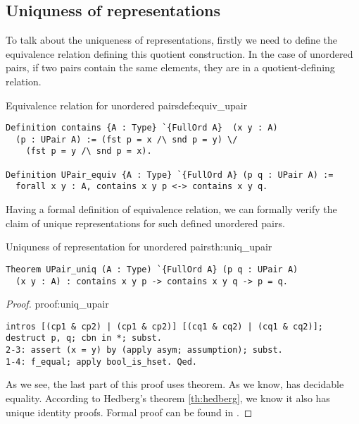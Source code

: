 \subsection{Uniquness of representations}
To talk about the uniqueness of representations, firstly we need to define the equivalence relation defining this quotient construction. In the case of unordered pairs, if two pairs contain the same elements, they are in a quotient-defining relation.
\begin{defi}{Equivalence relation for unordered pairs}{def:equiv_upair}
\begin{verbatim}
Definition contains {A : Type} `{FullOrd A}  (x y : A)
  (p : UPair A) := (fst p = x /\ snd p = y) \/ 
    (fst p = y /\ snd p = x).

Definition UPair_equiv {A : Type} `{FullOrd A} (p q : UPair A) :=
  forall x y : A, contains x y p <-> contains x y q. 
\end{verbatim}
\end{defi}
Having a formal definition of equivalence relation, we can formally verify the claim of unique representations for such defined unordered pairs.
\begin{theo}{Uniquness of representation for unordered pairs}{th:uniq_upair}
\begin{verbatim}
Theorem UPair_uniq (A : Type) `{FullOrd A} (p q : UPair A) 
  (x y : A) : contains x y p -> contains x y q -> p = q.
\end{verbatim}
\end{theo}
\begin{proof}{}{proof:uniq_upair}
\begin{verbatim}
intros [(cp1 & cp2) | (cp1 & cp2)] [(cq1 & cq2) | (cq1 & cq2)];
destruct p, q; cbn in *; subst.
2-3: assert (x = y) by (apply asym; assumption); subst.
1-4: f_equal; apply bool_is_hset. Qed.
\end{verbatim}
As we see, the last part of this proof uses  theorem. As we know,  has decidable equality. According to Hedberg's theorem \ref{th:hedberg}, we know it also has unique identity proofs. Formal proof can be found in .
\end{proof}
